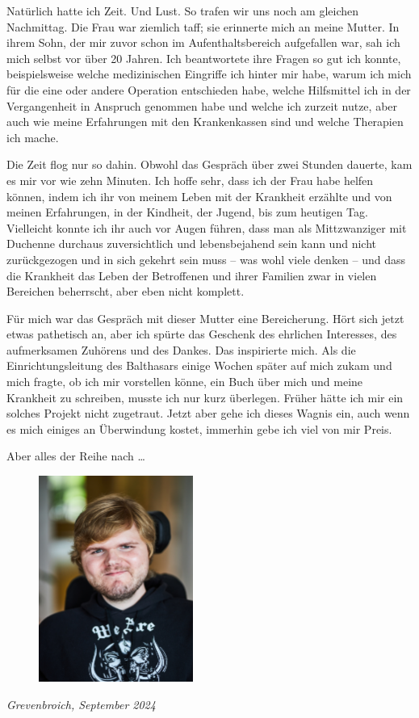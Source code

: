 \documentclass[fontsize=14pt,a4paper,headinclude,DIV=calc,automark]{scrbook}
\begin{document}
Natürlich hatte ich Zeit. Und Lust. So trafen wir uns noch am gleichen Nachmittag. Die Frau war ziemlich taff; sie erinnerte mich an meine Mutter. In ihrem Sohn, der mir zuvor schon im Aufenthaltsbereich aufgefallen war, sah ich mich selbst vor über 20 Jahren. Ich beantwortete ihre Fragen so gut ich konnte, beispielsweise welche medizinischen Eingriffe ich hinter mir habe, warum ich mich für die eine oder andere Operation entschieden habe, welche Hilfsmittel ich in der Vergangenheit in Anspruch genommen habe und welche ich zurzeit nutze, aber auch wie meine Erfahrungen mit den Krankenkassen sind und welche Therapien ich mache.

Die Zeit flog nur so dahin. Obwohl das Gespräch über zwei Stunden dauerte, kam es mir vor wie zehn Minuten. Ich hoffe sehr, dass ich der Frau habe helfen können, indem ich ihr von meinem Leben mit der Krankheit erzählte und von meinen Erfahrungen, in der Kindheit, der Jugend, bis zum heutigen Tag. Vielleicht konnte ich ihr auch vor Augen führen, dass man als Mittzwanziger mit Duchenne durchaus zuversichtlich und lebensbejahend sein kann und nicht zurückgezogen und in sich gekehrt sein muss – was wohl viele denken – und dass die Krankheit das Leben der Betroffenen und ihrer Familien zwar in vielen Bereichen beherrscht, aber eben nicht komplett.

Für mich war das Gespräch mit dieser Mutter eine Bereicherung. Hört sich jetzt etwas pathetisch an, aber ich spürte das Geschenk des ehrlichen Interesses, des aufmerksamen Zuhörens und des Dankes. Das inspirierte mich. Als die Einrichtungsleitung des Balthasars einige Wochen später auf mich zukam und mich fragte, ob ich mir vorstellen könne, ein Buch über mich und meine Krankheit zu schreiben, musste ich nur kurz überlegen. Früher hätte ich mir ein solches Projekt nicht zugetraut. Jetzt aber gehe ich dieses Wagnis ein, auch wenn es mich einiges an Überwindung kostet, immerhin gebe ich viel von mir Preis.

\noindent Aber alles der Reihe nach …

\begin{figure}[H]
    \raggedright
    \includegraphics[width=0.45\textwidth]{Fotos/marius_skaliert.jpg}
\end{figure}
\vspace{-1\baselineskip}
\noindent\small\textit{Grevenbroich, September 2024}
\end{document}
